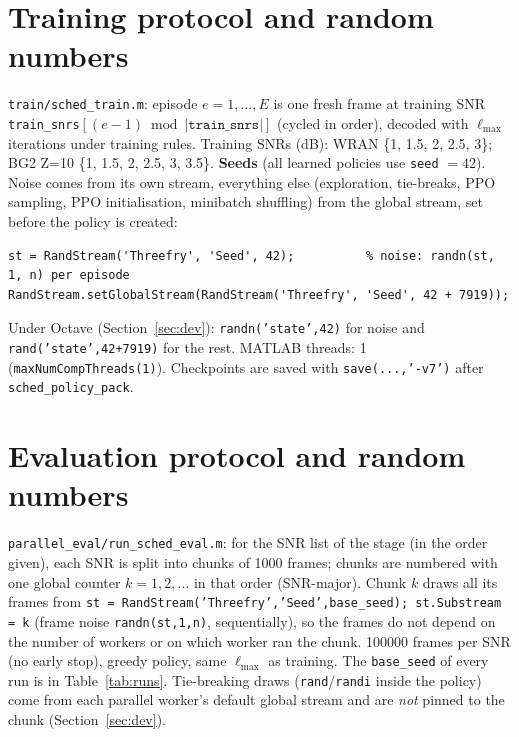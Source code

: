 \documentclass[10pt,a4paper]{article}
\begin{document}
\section{Training protocol and random numbers}\label{sec:train}
\texttt{train/sched\_train.m}: episode $e=1,\dots,E$ is one fresh frame at training SNR \texttt{train\_snrs}$[(e-1)\bmod |\texttt{train\_snrs}|]$ (cycled in order),
decoded with $\ell_{\max}$ iterations under training rules. Training SNRs (dB): WRAN \{1, 1.5, 2, 2.5, 3\}; BG2 Z=10 \{1, 1.5, 2, 2.5, 3, 3.5\}.
\textbf{Seeds} (all learned policies use \texttt{seed} $=42$). Noise comes from its own stream, everything else (exploration,
tie-breaks, PPO sampling, PPO initialisation, minibatch shuffling) from the global stream, set before the policy is created:
\begin{verbatim}
st = RandStream('Threefry', 'Seed', 42);          % noise: randn(st, 1, n) per episode
RandStream.setGlobalStream(RandStream('Threefry', 'Seed', 42 + 7919));
\end{verbatim}
Under Octave (Section~\ref{sec:dev}): \texttt{randn('state',42)} for noise and \texttt{rand('state',42+7919)} for the rest.
MATLAB threads: 1 (\texttt{maxNumCompThreads(1)}). Checkpoints are saved with \texttt{save(...,'-v7')} after \texttt{sched\_policy\_pack}.

\section{Evaluation protocol and random numbers}
\texttt{parallel\_eval/run\_sched\_eval.m}: for the SNR list of the stage (in the order given), each SNR is split into chunks
of 1000 frames; chunks are numbered with one global counter $k=1,2,\dots$ in that order (SNR-major). Chunk $k$ draws all its frames from
\texttt{st = RandStream('Threefry','Seed',base\_seed); st.Substream = k} (frame noise \texttt{randn(st,1,n)}, sequentially), so
the frames do not depend on the number of workers or on which worker ran the chunk. 100000 frames per SNR (no early stop),
greedy policy, same $\ell_{\max}$ as training. The \texttt{base\_seed} of every run is in Table~\ref{tab:runs}.
Tie-breaking draws (\texttt{rand}/\texttt{randi} inside the policy) come from each parallel worker's default global stream and are
\emph{not} pinned to the chunk (Section~\ref{sec:dev}).
\end{document}
